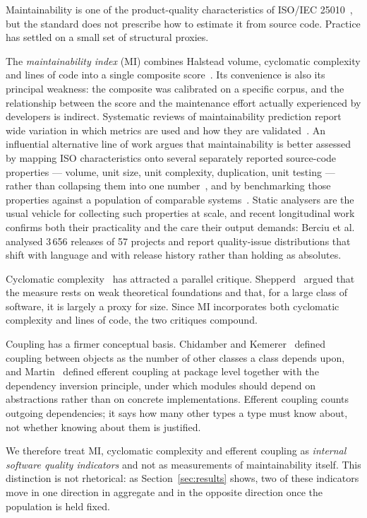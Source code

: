 \documentclass{sbc2019}%
\begin{document}
Maintainability is one of the product-quality characteristics of ISO/IEC 25010~\cite{iso25010}, but the standard does not prescribe how to estimate it from
source code. Practice has settled on a small set of structural proxies.

The \emph{maintainability index} (MI) combines Halstead volume, cyclomatic
complexity and lines of code into a single composite score~\cite{coleman1994}. Its convenience is also its principal weakness: the
composite was calibrated on a specific corpus, and the relationship between the
score and the maintenance effort actually experienced by developers is
indirect. Systematic reviews of maintainability prediction report wide
variation in which metrics are used and how they are validated~\cite{riaz2009,ardito2020}. An influential alternative line of work argues that
maintainability is better assessed by mapping ISO characteristics onto several
separately reported source-code properties --- volume, unit size, unit
complexity, duplication, unit testing --- rather than collapsing them into one
number~\cite{heitlager2007}, and by benchmarking those properties against a
population of comparable systems~\cite{baggen2012}. Static analysers are the
usual vehicle for collecting such properties at scale, and recent longitudinal
work confirms both their practicality and the care their output demands: Berciu
et al.\ \cite{berciu2026} analysed 3\,656 releases of 57 projects and report
quality-issue distributions that shift with language and with release history
rather than holding as absolutes.

Cyclomatic complexity~\cite{mccabe1976} has attracted a parallel critique.
Shepperd~\cite{shepperd1988} argued that the measure rests on weak theoretical
foundations and that, for a large class of software, it is largely a proxy for
size. Since MI incorporates both cyclomatic complexity and lines of code, the
two critiques compound.

Coupling has a firmer conceptual basis. Chidamber and Kemerer~\cite{chidamber1994} defined coupling between objects as the number of other
classes a class depends upon, and Martin~\cite{martin2003} defined efferent
coupling at package level together with the dependency inversion principle,
under which modules should depend on abstractions rather than on concrete
implementations. Efferent coupling counts outgoing dependencies; it says how
many other types a type must know about, not whether knowing about them is
justified.

We therefore treat MI, cyclomatic complexity and efferent coupling as
\emph{internal software quality indicators} and not as measurements of
maintainability itself. This distinction is not rhetorical: as
Section~\ref{sec:results} shows, two of these indicators move in one direction
in aggregate and in the opposite direction once the population is held fixed.
\end{document}
